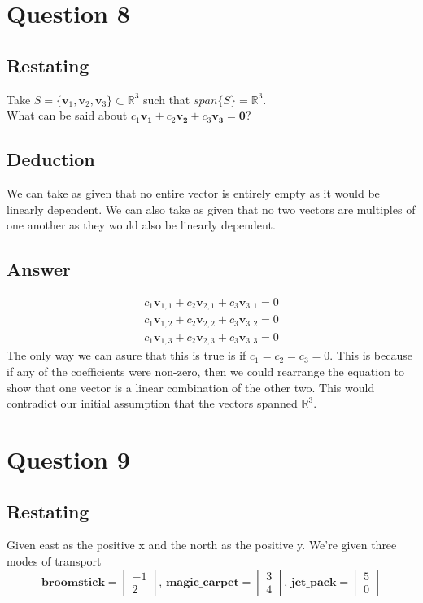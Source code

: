\documentclass{article}
\begin{document}
    \section{Question 8}
        \subsection{Restating}
            Take $S=\{\mathbf{v}_1, \mathbf{v}_2, \mathbf{v}_3\} \subset \mathbb{R}^3$
            such that $span\{S\} = \mathbb{R}^3$. \\
            What can be said about $c_1\mathbf{v_1} + c_2\mathbf{v_2} + c_3\mathbf{v_3} = \mathbf{0}$?
        \subsection{Deduction}
            We can take as given that no entire vector is entirely empty as it
            would be linearly dependent. We can also take as given that no two vectors
            are multiples of one another as they would also be linearly dependent.
        \subsection{Answer}
            \begin{gather*}
            c_1\mathbf{v}_{1,1} + c_2\mathbf{v}_{2,1} + c_3\mathbf{v}_{3,1} = 0 \\
            c_1\mathbf{v}_{1,2} + c_2\mathbf{v}_{2,2} + c_3\mathbf{v}_{3,2} = 0 \\
            c_1\mathbf{v}_{1,3} + c_2\mathbf{v}_{2,3} + c_3\mathbf{v}_{3,3} = 0 
            \end{gather*}
            The only way we can asure that this is true is if $c_1 = c_2 = c_3 = 0$.
            This is because if any of the coefficients were non-zero, then we could
            rearrange the equation to show that one vector is a linear combination of the other two.
            This would contradict our initial assumption that the vectors spanned $\mathbb{R}^3$.
        
         
            


    \section{Question 9}
        \subsection{Restating}
            Given east as the positive x and the north as the positive y.
            We're given three modes of transport
            \[
            \mathbf{broomstick} = \begin{bmatrix}-1 \\ 2\end{bmatrix}\text{, }
            \mathbf{magic\_carpet} = \begin{bmatrix}3 \\ 4\end{bmatrix}\text{, }
            \mathbf{jet\_pack} = \begin{bmatrix}5 \\ 0\end{bmatrix}\]
\end{document}
